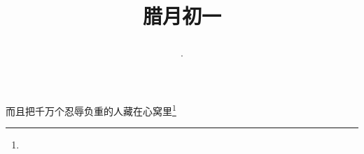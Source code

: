 \title{\date[d=11,m=1,y=2024][year:cn-y,年,month:cn,day:cn,日,·,weekday]·腊月初一 }
而且把千万个忍辱负重的人藏在心窝里\footnote{ }

